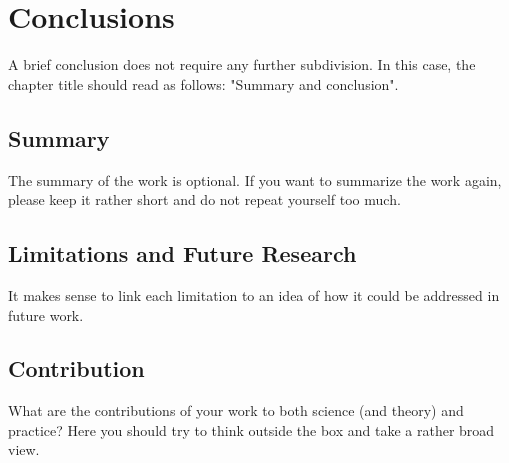 \section{Conclusions}\label{chap:conclusions}
A brief conclusion does not require any further subdivision. In this case, the chapter title should read as follows: "Summary and conclusion".

\subsection{Summary}

The summary of the work is optional. If you want to summarize the work again, please keep it rather short and do not repeat yourself too much.
\subsection{Limitations and Future Research}
It makes sense to link each limitation to an idea of how it could be addressed in future work.
\subsection{Contribution}
What are the contributions of your work to both science (and theory) and practice? Here you should try to think outside the box and take a rather broad view.